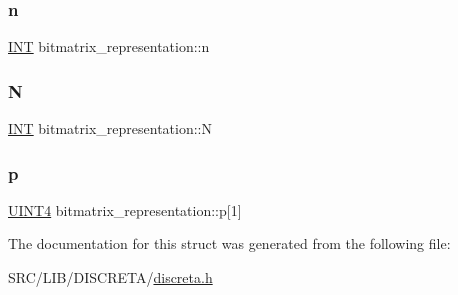 \subsubsection{\texorpdfstring{n}{n}}
{\footnotesize\ttfamily \mbox{\hyperlink{galois_8h_a09fddde158a3a20bd2dcadb609de11dc}{I\+NT}} bitmatrix\+\_\+representation\+::n}

\mbox{\label{structbitmatrix__representation_ad4d433383609dd2cde0de2a1366f507f}} 
\subsubsection{\texorpdfstring{N}{N}}
{\footnotesize\ttfamily \mbox{\hyperlink{galois_8h_a09fddde158a3a20bd2dcadb609de11dc}{I\+NT}} bitmatrix\+\_\+representation\+::N}

\mbox{\label{structbitmatrix__representation_a1b3ea449937515a80e5237e8f5f29787}} 
\subsubsection{\texorpdfstring{p}{p}}
{\footnotesize\ttfamily \mbox{\hyperlink{galois_8h_ac94af6544c710549c9fca744fd510395}{U\+I\+N\+T4}} bitmatrix\+\_\+representation\+::p\mbox{[}1\mbox{]}}



The documentation for this struct was generated from the following file\+:\begin{DoxyCompactItemize}
\item 
S\+R\+C/\+L\+I\+B/\+D\+I\+S\+C\+R\+E\+T\+A/\mbox{\hyperlink{discreta_8h}{discreta.\+h}}\end{DoxyCompactItemize}
